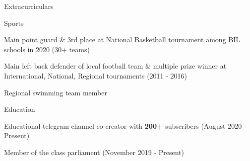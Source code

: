 \documentclass{resume}
\begin{document}
\begin{rSection}{Extracurriculars}
\begin{rSubsection}{Sports}{}{}{}
\item Main point guard \& 3rd place at National Basketball tournament among BIL schools in 2020 (30+ teams) 
\item Main left back defender of local football team \& multiple prize winner at International, National, Regional tournaments (2011 - 2016) 
\item Regional swimming team member  
\end{rSubsection}
\begin{rSubsection}{Education}{}{}{}
\item Educational telegram channel co-creator with \textbf{200+} subscribers (August 2020 - Present)  
\item Member of the class parliament (November 2019 - Present) 
\end{rSubsection}
\end{rSection}






\end{document}
